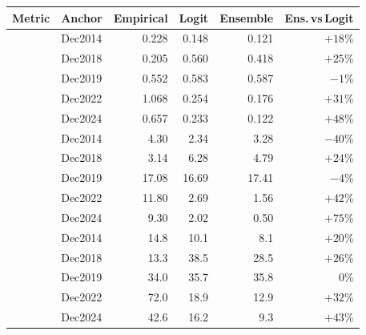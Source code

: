\begin{tabular}{llrrrr}
\toprule
Metric & Anchor & Empirical & Logit & Ensemble & Ens.\,vs\,Logit \\
\midrule
{} & Dec2014 & 0.228 & 0.148 & 0.121 & $+18\%$ \\
 & Dec2018 & 0.205 & 0.560 & 0.418 & $+25\%$ \\
 & Dec2019 & 0.552 & 0.583 & 0.587 & $-1\%$ \\
 & Dec2022 & 1.068 & 0.254 & 0.176 & $+31\%$ \\
 & Dec2024 & 0.657 & 0.233 & 0.122 & $+48\%$ \\
\midrule
{} & Dec2014 & 4.30 & 2.34 & 3.28 & $-40\%$ \\
 & Dec2018 & 3.14 & 6.28 & 4.79 & $+24\%$ \\
 & Dec2019 & 17.08 & 16.69 & 17.41 & $-4\%$ \\
 & Dec2022 & 11.80 & 2.69 & 1.56 & $+42\%$ \\
 & Dec2024 & 9.30 & 2.02 & 0.50 & $+75\%$ \\
\midrule
{} & Dec2014 & 14.8 & 10.1 & 8.1 & $+20\%$ \\
 & Dec2018 & 13.3 & 38.5 & 28.5 & $+26\%$ \\
 & Dec2019 & 34.0 & 35.7 & 35.8 & $0\%$ \\
 & Dec2022 & 72.0 & 18.9 & 12.9 & $+32\%$ \\
 & Dec2024 & 42.6 & 16.2 & 9.3 & $+43\%$ \\
\bottomrule
\end{tabular}
